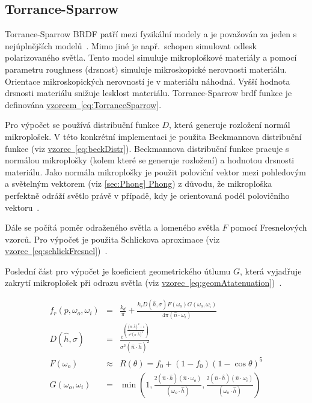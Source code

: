 \documentclass[czech,master]{diploma}
\newcommand{\uvec}[1]{\hat{#1}}
\newcommand{\point}{p}
\newcommand{\brdf}{f_r\left(\point,\omega_{o},\omega_{i}\right)}
\newcommand{\normVec}{\uvec{n}}
\newcommand{\inVec}{\omega_{i}}
\newcommand{\outVec}{\omega_{o}}
\newcommand{\halfVec}{\uvec{h}}
\newcommand{\rough}{\sigma}
\newcommand{\ior}{f_0}
\begin{document}
\subsection{Torrance-Sparrow} \label{sec:torrancesparrow}
Torrance-Sparrow BRDF patří mezi fyzikální modely a je považován za jeden s nejúplnějších modelů~\cite{BRDFOverview}. Mimo jiné je např.\ schopen simulovat odlesk polarizovaného světla. Tento model simuluje mikroploškové materiály a pomocí parametru roughness (drsnost) simuluje mikroskopické nerovnosti materiálu. Orientace mikroskopických nerovností je v materiálu náhodná. Vyšší hodnota drsnosti materiálu snižuje lesklost materiálu. Torrance-Sparrow brdf funkce je definována \hyperref[eq:TorranceSparrow]{vzorcem~\ref{eq:TorranceSparrow}}. \par
Pro výpočet se používá distribuční funkce \(D\), která generuje rozložení normál mikroplošek. V této konkrétní implementaci je použita Beckmannova distribuční funkce (viz \hyperref[eq:beckDistr]{vzorec~\ref{eq:beckDistr}}). Beckmannova distribuční funkce pracuje s normálou mikroplošky (kolem které se generuje rozložení) a hodnotou drsnosti materiálu. Jako normála mikroplošky je použit poloviční vektor mezi pohledovým a světelným vektorem (viz \hyperref[sec:Phong]{\ref{sec:Phong} Phong}) z důvodu, že mikroploška perfektně odráží světlo právě v případě, kdy je orientovaná podél polovičního vektoru~\cite{PHARR2017507}. \par
Dále se počítá poměr odraženého světla a lomeného světla \(F\) pomocí Fresnelových vzorců. Pro výpočet je použita Schlickova aproximace (viz \hyperref[eq:schlickFresnel]{vzorec~\ref{eq:schlickFresnel}})~\cite{SchlickFresnel}. \par
Poslední část pro výpočet je koeficient geometrického útlumu \(G\), která vyjadřuje zakrytí mikroplošek při odrazu světla (viz \hyperref[eq:geomAtatenuation]{vzorec~\ref{eq:geomAtatenuation}})~\cite{BRDFOverview}.


\begin{eqnarray}
  \brdf & = & \frac{k_d}{\pi} + \frac{k_s D(\halfVec,\rough) F(\outVec) G(\outVec,\inVec)}{4\pi (\normVec \cdot \inVec)}\label{eq:TorranceSparrow}\\
  D(\halfVec,\rough) & = & \frac{e^{\left(\frac{(\normVec\cdot \halfVec)^{2}-1}{\rough^{2}(\normVec \cdot \halfVec)^{2}}\right)}}{\rough^2(\normVec\cdot \halfVec)^{2}}\label{eq:beckDistr}\\
  F(\outVec) & \approx & R(\theta) = \ior + {(1-\ior)}{(1-\cos\theta)}^{5}\label{eq:schlickFresnel}\\
  G(\outVec,\inVec) & = & \min \left( 1, \frac{2 ( \normVec \cdot \halfVec ) ( \normVec \cdot \outVec )
    }{ ( \outVec \cdot \halfVec ) },\frac{ 2 ( \normVec \cdot \halfVec ) ( \normVec \cdot \inVec ) }{ ( \outVec \cdot \halfVec ) } \right) \label{eq:geomAtatenuation}
\end{eqnarray}
\end{document}
